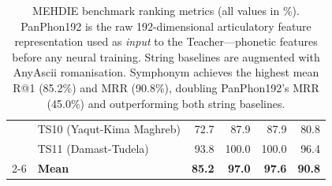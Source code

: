 \documentclass[11pt,a4paper]{article}
\begin{document}
\begin{table}[p]
\begin{tabular}{llrrrr}
& TS10 (Yaqut-Kima Maghreb) & 72.7 & 87.9 & 87.9 & 80.8 \\
& TS11 (Damast-Tudela) & 93.8 & 100.0 & 100.0 & 96.4 \\
\cmidrule{2-6}
& \textbf{Mean} & \textbf{85.2} & \textbf{97.0} & \textbf{97.6} & \textbf{90.8} \\
\bottomrule
\end{tabular}
\caption{MEHDIE benchmark ranking metrics (all values in \%). PanPhon192 is the raw 192-dimensional articulatory feature representation used as \emph{input} to the Teacher---phonetic features before any neural training. String baselines are augmented with AnyAscii romanisation. Symphonym achieves the highest mean R@1 (85.2\%) and MRR (90.8\%), doubling PanPhon192's MRR (45.0\%) and outperforming both string baselines.}
\label{tab:mehdie-ranking}
\end{table}
\end{document}

